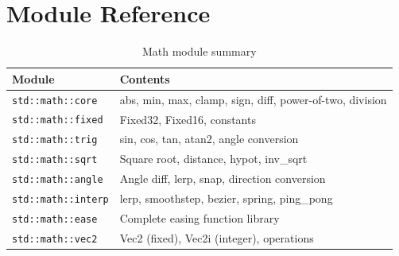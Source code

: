 \section{Module Reference}
\label{sec:math-reference}

\begin{table}[h]
\centering
\begin{tabular}{lp{8cm}}
\textbf{Module} & \textbf{Contents} \\
\hline
\texttt{std::math::core} & abs, min, max, clamp, sign, diff, power-of-two, division \\
\texttt{std::math::fixed} & Fixed32, Fixed16, constants \\
\texttt{std::math::trig} & sin, cos, tan, atan2, angle conversion \\
\texttt{std::math::sqrt} & Square root, distance, hypot, inv\_sqrt \\
\texttt{std::math::angle} & Angle diff, lerp, snap, direction conversion \\
\texttt{std::math::interp} & lerp, smoothstep, bezier, spring, ping\_pong \\
\texttt{std::math::ease} & Complete easing function library \\
\texttt{std::math::vec2} & Vec2 (fixed), Vec2i (integer), operations \\
\end{tabular}
\caption{Math module summary}
\end{table}
